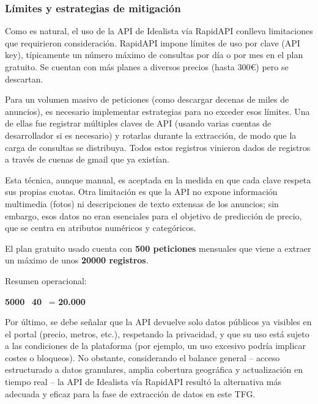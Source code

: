 \documentclass[a4paper,11pt]{book}
\begin{document}
\subsubsection{Límites y estrategias de mitigación}

Como es natural, el uso de la API de Idealista vía RapidAPI conlleva limitaciones que requirieron consideración. RapidAPI impone límites de uso por clave (API key), típicamente un número máximo de consultas por día o por mes en el plan gratuito. Se cuentan con más planes a diversos precios (hasta 300€) pero se descartan. 

Para un volumen masivo de peticiones (como descargar decenas de miles de anuncios), es necesario implementar estrategias para no exceder esos límites. Una de ellas fue registrar múltiples claves de API (usando varias cuentas de desarrollador si es necesario) y rotarlas durante la extracción, de modo que la carga de consultas se distribuya. Todos estos registros vinieron dados de registros a través de cuenas de gmail que ya existían. 

Esta técnica, aunque manual, es aceptada en la medida en que cada clave respeta sus propias cuotas. Otra limitación es que la API no expone información multimedia (fotos) ni descripciones de texto extensas de los anuncios; sin embargo, esos datos no eran esenciales para el objetivo de predicción de precio, que se centra en atributos numéricos y categóricos. 

El plan gratuito usado cuenta con \textbf{500 peticiones} mensuales que viene a extraer un máximo de unos \textbf{20000 registros}. 

Resumen operacional:

\textbf{5000} \,  \times \textbf{40} \,  = \textbf{20.000} \, 


Por último, se debe señalar que la API devuelve solo datos públicos ya visibles en el portal (precio, metros, etc.), respetando la privacidad, y que su uso está sujeto a las condiciones de la plataforma (por ejemplo, un uso excesivo podría implicar costes o bloqueos). No obstante, considerando el balance general – acceso estructurado a datos granulares, amplia cobertura geográfica y actualización en tiempo real – la API de Idealista vía RapidAPI resultó la alternativa más adecuada y eficaz para la fase de extracción de datos en este TFG.
\end{document}
